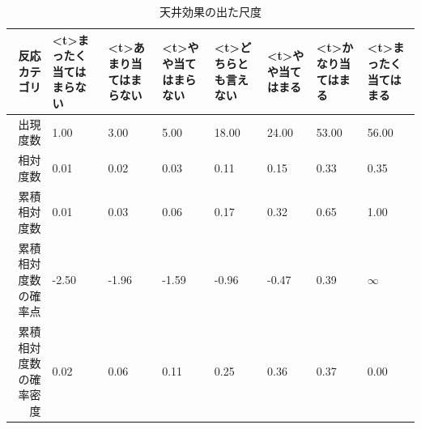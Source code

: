 \documentclass{ltjsbook}
\begin{document}
\begin{table}[ht]
	\centering
	\caption{天井効果の出た尺度}
	\begin{tabular}{rp{1cm}p{1cm}p{1cm}p{1cm}p{1cm}p{1cm}p{1cm}}
		\hline
		反応カテゴリ      & \pbox<t>{\small{まったく当てはまらない}} & \pbox<t>{\small{あまり当てはまらない}} & \pbox<t>{\small{やや当てはまらない}} & \pbox<t>{\small{どちらとも言えない}} & \pbox<t>{\small{やや当てはまる}} & \pbox<t>{\small{かなり当てはまる}} & \pbox<t>{\small{まったく当てはまる}} \\
		\hline
		出現度数        & 1.00                          & 3.00                         & 5.00                        & 18.00                       & 24.00                     & 53.00                      & 56.00                       \\
		相対度数        & 0.01                          & 0.02                         & 0.03                        & 0.11                        & 0.15                      & 0.33                       & 0.35                        \\
		累積相対度数      & 0.01                          & 0.03                         & 0.06                        & 0.17                        & 0.32                      & 0.65                       & 1.00                        \\
		累積相対度数の確率点  & -2.50                         & -1.96                        & -1.59                       & -0.96                       & -0.47                     & 0.39                       & $\infty$                    \\
		累積相対度数の確率密度 & 0.02                          & 0.06                         & 0.11                        & 0.25                        & 0.36                      & 0.37                       & 0.00                        \\
		\hline
	\end{tabular}
	\label{tbl:02_03}
\end{table}
\end{document}
